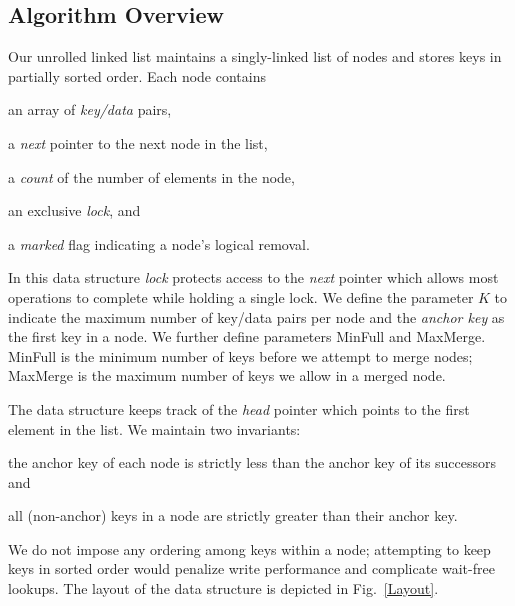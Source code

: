 \documentclass{llncs}
\begin{document}
\subsection{Algorithm Overview}
Our unrolled linked list maintains a singly-linked list
of nodes and stores keys in partially sorted order.  Each node contains
\begin{inparaenum}[(i)] 
\item an array of {\em key/data} pairs,
\item a {\em next} pointer to the next node in the list, 
\item a {\em count} of the number of elements in the node, 
\item an exclusive {\em lock},
and \item a {\em marked} flag indicating a node's logical removal. 
\end{inparaenum}
In this data structure {\em lock} protects access to the {\em next} pointer which
allows most operations to complete while holding a single lock. 
We define the parameter $K$ to indicate the maximum number 
of key/data pairs per node and the {\em anchor key} as 
the first key in a node.  We further define parameters {\sc MinFull} and 
{\sc MaxMerge}. {\sc MinFull} is the minimum number of keys before
we attempt to merge nodes; {\sc MaxMerge} is the maximum number of
keys we allow in a merged node.

The data structure keeps track of the {\em head} pointer which
points to the first element in the list.  We maintain two invariants:
\begin{inparaenum}[(i)]
\item the anchor key of each node is strictly less than the anchor key of its successors and 
\item all (non-anchor) keys in a node are strictly greater than their
anchor key.
\end{inparaenum}
We do not impose any ordering among keys within a node;
attempting to keep keys in sorted order would penalize write performance
and complicate wait-free lookups.
The layout of the data structure is depicted in Fig.~\ref{Layout}.
\end{document}
